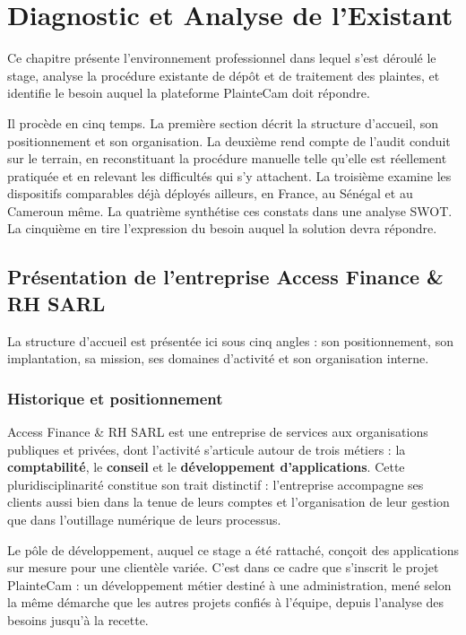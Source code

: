 
\chapter{Diagnostic et Analyse de l'Existant}
\label{ch:diagnostic}

Ce chapitre présente l'environnement professionnel dans lequel s'est déroulé le stage, analyse la procédure existante de dépôt et de traitement des plaintes, et identifie le besoin auquel la plateforme PlainteCam doit répondre.

Il procède en cinq temps. La première section décrit la structure d'accueil, son positionnement et son organisation. La deuxième rend compte de l'audit conduit sur le terrain, en reconstituant la procédure manuelle telle qu'elle est réellement pratiquée et en relevant les difficultés qui s'y attachent. La troisième examine les dispositifs comparables déjà déployés ailleurs, en France, au Sénégal et au Cameroun même. La quatrième synthétise ces constats dans une analyse SWOT. La cinquième en tire l'expression du besoin auquel la solution devra répondre.

\section{Présentation de l'entreprise Access Finance \& RH SARL}

La structure d'accueil est présentée ici sous cinq angles : son positionnement, son implantation, sa mission, ses domaines d'activité et son organisation interne.

\subsection{Historique et positionnement}

Access Finance \& RH SARL est une entreprise de services aux organisations publiques et privées, dont l'activité s'articule autour de trois métiers : la \textbf{comptabilité}, le \textbf{conseil} et le \textbf{développement d'applications}. Cette pluridisciplinarité constitue son trait distinctif : l'entreprise accompagne ses clients aussi bien dans la tenue de leurs comptes et l'organisation de leur gestion que dans l'outillage numérique de leurs processus.

Le pôle de développement, auquel ce stage a été rattaché, conçoit des applications sur mesure pour une clientèle variée. C'est dans ce cadre que s'inscrit le projet PlainteCam : un développement métier destiné à une administration, mené selon la même démarche que les autres projets confiés à l'équipe, depuis l'analyse des besoins jusqu'à la recette.

